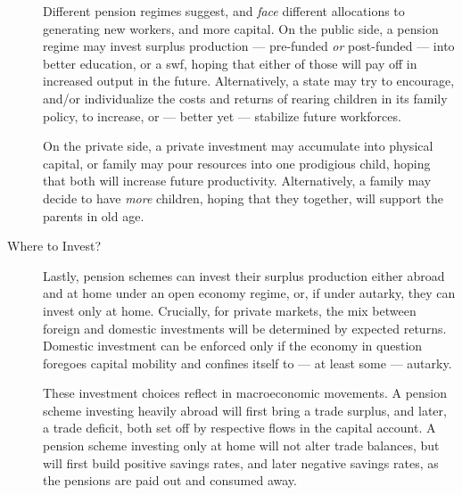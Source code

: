 \begin{description}
	Different pension regimes suggest, and \emph{face} different allocations to generating new workers, and more capital.
	On the public side, a pension regime may invest surplus production --- pre-funded \emph{or} post-funded --- into better education, or a \gls{swf}, hoping that either of those will pay off in increased output in the future.
	Alternatively, a state may try to encourage, and/or individualize the costs and returns of rearing children in its family policy, to increase, or --- better yet --- stabilize future workforces.

	On the private side, a private investment may accumulate into physical capital, or family may pour resources into one prodigious child, hoping that both will increase future productivity.
	Alternatively, a family may decide to have \emph{more} children, hoping that they together, will support the parents in old age.

	\item[Where to Invest?] Lastly, pension schemes can invest their surplus production either abroad and at home under an open economy regime, or, if under autarky, they can invest only at home.
	Crucially, for private markets, the mix between foreign and domestic investments will be determined by expected returns.
	Domestic investment can be enforced only if the economy in question foregoes capital mobility and confines itself to --- at least some --- autarky.

	These investment choices reflect in macroeconomic movements.
	A pension scheme investing heavily abroad will first bring a trade surplus, and later, a trade deficit, both set off by respective flows in the capital account.
	A pension scheme investing only at home will not alter trade balances, but will first build positive savings rates, and later negative savings rates, as the pensions are paid out and consumed away.
\end{description}


